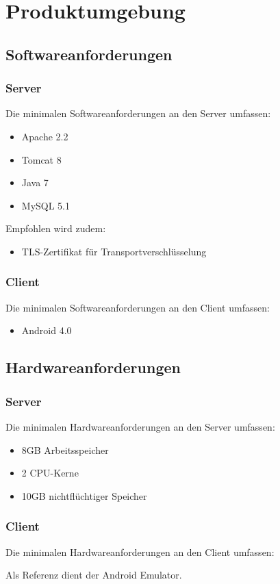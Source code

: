 \section{Produktumgebung}
\subsection{Softwareanforderungen}

\subsubsection{Server}
Die minimalen Softwareanforderungen an den Server umfassen:
\begin{itemize}
\item Apache 2.2
\item Tomcat 8
\item Java 7
\item MySQL 5.1

\end{itemize}

Empfohlen wird zudem:
\begin{itemize}
\item TLS-Zertifikat für Transportverschlüsselung
\end{itemize}

\subsubsection{Client}
Die minimalen Softwareanforderungen an den Client umfassen:
\begin{itemize}
\item Android 4.0

\end{itemize}


\subsection{Hardwareanforderungen}
\subsubsection{Server}
Die minimalen Hardwareanforderungen an den Server umfassen:
\begin{itemize}
\item 8GB Arbeitsspeicher
\item 2 CPU-Kerne
\item 10GB nichtflüchtiger Speicher
\end{itemize}

\subsubsection{Client}
Die minimalen Hardwareanforderungen an den Client umfassen:

Als Referenz dient der Android Emulator.

